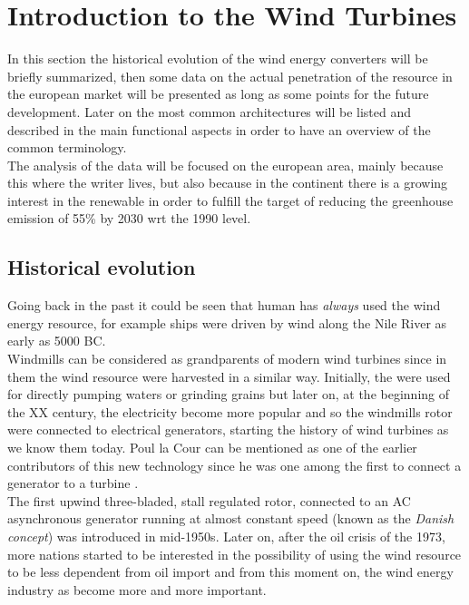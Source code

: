 \newpage
\section{Introduction to the Wind Turbines}\label{sec:c_WT_characteristics}
In this section the historical evolution of the wind energy converters will be briefly summarized, then some data on the actual penetration of the resource in the european market will be presented as long as some points for the future development. Later on the most common architectures will be listed and described in the main functional aspects in order to have an overview of the common terminology.\\
The analysis of the data will be focused on the european area, mainly because this where the writer lives, but also because in the continent there is a growing interest in the renewable in order to fulfill the target of reducing the greenhouse emission of 55\% by 2030 wrt the 1990 level. 

\subsection{Historical evolution}
Going back in the past it could be seen that human has \textit{always} used the wind energy resource, for example ships were driven by wind along the Nile River as early as 5000 BC.\\
Windmills can be considered as grandparents of modern wind turbines since in them the wind resource were harvested in a similar way. Initially, the were used for directly pumping waters or grinding grains but later on, at the beginning of the XX century, the electricity become more popular and so the windmills rotor were connected to electrical generators, starting the history of wind turbines as we know them today. Poul la Cour can be mentioned as one of the earlier contributors of this new technology since he was one among the first to connect a generator to a turbine \cite{Aerodynamics_of_wind_turbines}. \\
The first upwind three-bladed, stall regulated rotor, connected to an AC asynchronous generator running at almost constant speed (known as the \textit{Danish concept}) was introduced in mid-1950s. Later on, after the oil crisis of the 1973, more nations started to be interested in the possibility of using the wind resource to be less dependent from oil import and from this moment on, the wind energy industry as become more and more important. 

